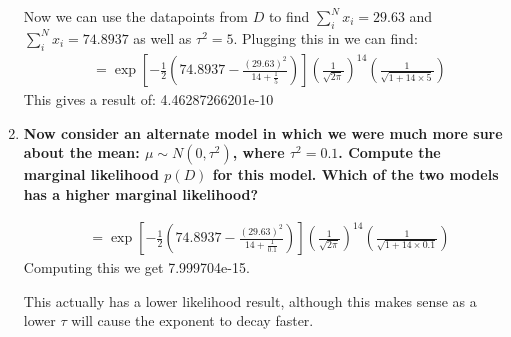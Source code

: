 \documentclass[submit]{harvardml}
\begin{document}
\begin{enumerate}
    Now we can use the datapoints from $D$ to find $\sum_i^N x_i = 29.63$ and $\sum_i^N x_i = 74.8937$ as well as $\tau^2=5$. Plugging this in we can find:
    \begin{align*}
        &= \exp \left[-\frac{1}{2} \left( 74.8937 - \frac{(29.63)^2}{14 + \frac{1}{5}} \right) \right] \left(\frac{1}{\sqrt{2\pi}}\right)^{14} \left(\frac{1}{\sqrt{1 + 14 \times 5}} \right)
    \end{align*}
    This gives a result of: 4.46287266201e-10\\ 
    \item\textbf{ Now consider an alternate model in which we were much more sure about the mean: $\mu \sim N(0,\tau^2)$, where $\tau^2 = 0.1$. Compute the marginal likelihood $p(D)$ for this model.  Which of the two models has a higher marginal likelihood?}
  
  \begin{align*}
        &= \exp \left[-\frac{1}{2} \left( 74.8937 - \frac{(29.63)^2}{14 + \frac{1}{0.1}} \right) \right] \left(\frac{1}{\sqrt{2\pi}}\right)^{14} \left(\frac{1}{\sqrt{1 + 14 \times 0.1}} \right)
    \end{align*}
    Computing this we get 7.999704e-15.
    
    This actually has a lower likelihood result, although this makes sense as a lower $\tau$ will cause the exponent to decay faster.
\end{enumerate}
\end{document}
